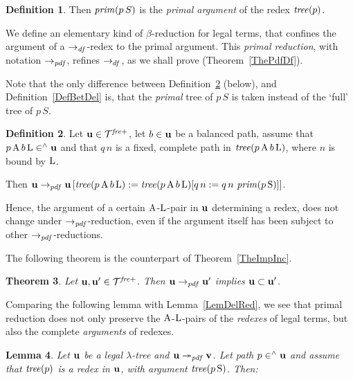 \documentclass{article}
\theoremstyle{plain}
\newtheorem{The}{Theorem}[section]
\newtheorem{Lem}[The]{Lemma}
\theoremstyle{definition}
\newtheorem{Def}[The]{Definition}
\begin{document}
{\begin{Def}
Then ${\it prim}(p \, S)$ is the {\em primal argument\/} of the redex ${\it tree}(p)$.
\end{Def}

We define an elementary kind of $\beta$-reduction for legal terms, that confines the argument of a $\rightarrow_{\it df}$-redex to the primal argument. This {\em primal reduction\/}, with notation $\rightarrow_{\it pdf}$, refines $\rightarrow_{df}$, as we shall prove (Theorem~\ref{ThePdfDf}).

Note that the only difference between Definition~\ref{DefBetEle} (below), and Definition~\ref{DefBetDel} is, that the {\it primal\/} tree of $p \, S$ is taken instead of the `full' tree of $p \, S$.

\begin{Def}\label{DefBetEle}
Let ${\bf u} \in {\cal T}^{\it fre+}$, let $b \in {\bf u}$ be a balanced path, assume that $p \, {\rm A} \, b \, {\rm L} \in^\wedge {\bf u}$ and that $q \, n$ is a fixed, complete path in ${\it tree}(p \, {\rm A} \, b \, {\rm L})$, where $n$ is bound by ${\rm L}$.

\smallskip

Then ${\bf u} \rightarrow_{\it pdf} {\bf u} \, [{\it tree}(p \, {\rm A} \, b \, {\rm L}) := {\it tree}(p \, {\rm A} \, b \, {\rm L})[q \, n := q \, n \, \, {\it prim}(p \, {\rm S})]]$.
\end{Def}

Hence, the argument of a certain ${\rm A}$-${\rm L}$-pair in ${\bf u}$ determining a redex, does not change under $\rightarrow_{\it pdf}$-reduction, even if the argument itself has been subject to other $\rightarrow_{\it pdf}$-reductions.

The following theorem is the counterpart of Theorem~\ref{TheImpInc}.

\begin{The}\label{TheImpIncPri}
Let ${\bf u}, {\bf u'} \in {\cal T}^{\it fre+}$. Then ${\bf u} \rightarrow_{\it pdf} {\bf u'}$ implies ${\bf u} \subset {\bf u'}$.
\end{The}

Comparing the following lemma with Lemma~\ref{LemDelRed}, we see that primal reduction does not only preserve the ${\rm A}$-${\rm L}$-pairs of the {\em redexes\/} of legal terms, but also the complete {\em arguments\/} of redexes.

\begin{Lem}\label{LemPriRed}
Let ${\bf u}$ be a legal $\lambda$-tree and ${\bf u} \twoheadrightarrow_{\it pdf} {\bf v}$. Let path $p \in^\wedge {\bf u}$ and assume that ${\it tree}(p)$ is a redex in ${\bf u}$, with argument ${\it tree}(p \, {\rm S})$. Then:


\end{Lem}}
\end{document}
